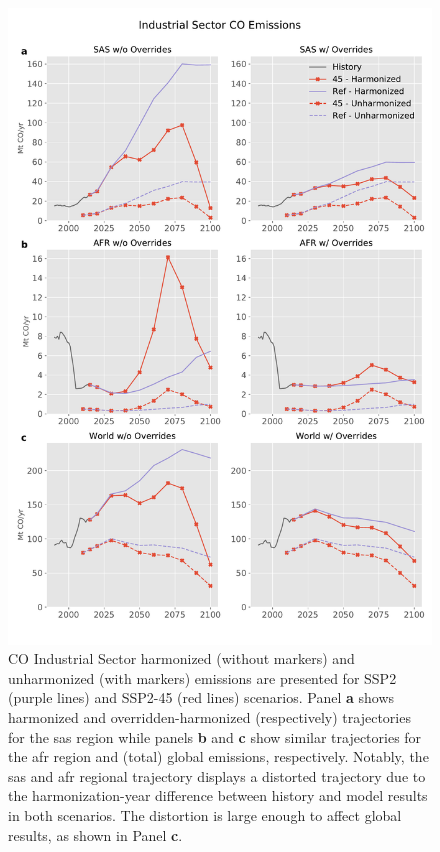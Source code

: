\documentclass[review]{elsarticle}
\begin{document}
\begin{figure}
  \begin{center}
    \includegraphics[height=0.8\textheight]{sep_regions_results_CO_Industrial_Sector.pdf}
    \caption[]{
      \label{fig:co}
      CO Industrial Sector harmonized (without markers) and unharmonized (with
      markers) emissions are presented for SSP2 (purple lines) and SSP2-45 (red
      lines) scenarios. Panel \textbf{a} shows harmonized and
      overridden-harmonized (respectively) trajectories for the \gls{sas} region
      while panels \textbf{b} and \textbf{c} show similar trajectories for the
      \gls{afr} region and (total) global emissions, respectively. Notably, the
      \gls{sas} and \gls{afr} regional trajectory displays a distorted
      trajectory due to the harmonization-year difference between history and
      model results in both scenarios. The distortion is large enough to affect
      global results, as shown in Panel \textbf{c}.  }
  \end{center}
\end{figure}
\end{document}
